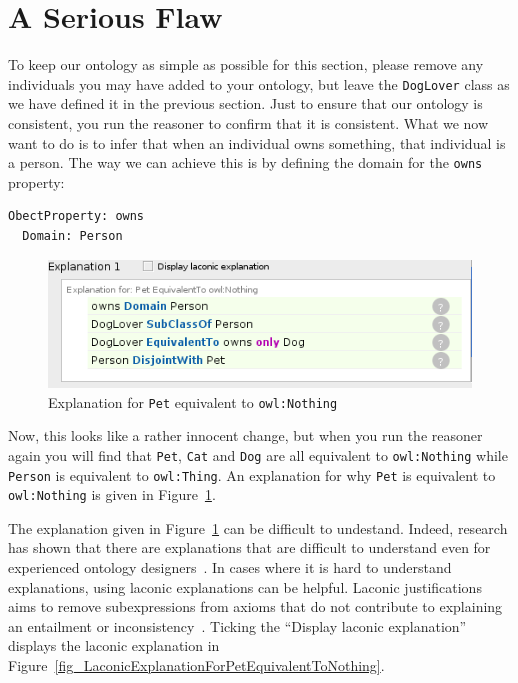 \documentclass{amsart}
\begin{document}
  \section{A Serious Flaw}
  To keep our ontology as simple as possible for this section, please remove any individuals you may have added to your ontology, but leave the \texttt{DogLover} class as we have defined it in the previous section. Just to ensure that our ontology is consistent, you run the reasoner to confirm that it is consistent. What we now want to do is to infer that when an individual owns something, that individual is a person. The way we can achieve this is by defining the domain for the \texttt{owns} property:
\begin{small}
\begin{verbatim} 
ObectProperty: owns
  Domain: Person
\end{verbatim}
\end{small}  
    \begin{figure}
      \centering \includegraphics[trim = 0mm 0mm 0mm 0mm, clip, scale=0.65]{./ExplanationForPetEquivalentToNothing.png}
      \caption{Explanation for \texttt{Pet} equivalent to \texttt{owl:Nothing}}\label{fig_ExplanationForPetEquivalentToNothing}
    \end{figure}
    
Now, this looks like a rather innocent change, but when you run the reasoner again you will find that \texttt{Pet}, \texttt{Cat} and \texttt{Dog} are all equivalent to \texttt{owl:Nothing} while \texttt{Person} is equivalent to \texttt{owl:Thing}.
An explanation for why \texttt{Pet} is equivalent to \texttt{owl:Nothing} is given in Figure~\ref{fig_ExplanationForPetEquivalentToNothing}.

The explanation given in Figure~\ref{fig_ExplanationForPetEquivalentToNothing} can be difficult to undestand. Indeed, research has shown that there are explanations that are difficult to understand even for experienced ontology designers~\cite{Horridge2011,Horridge2013}. In cases where it is hard to understand explanations, using laconic explanations can be helpful. Laconic justifications aims to remove subexpressions from axioms that do not contribute to explaining an entailment or inconsistency~\cite{Horridge2011,Horridge2013}. Ticking the ``Display laconic explanation'' displays the laconic explanation in Figure~\ref{fig_LaconicExplanationForPetEquivalentToNothing}.
\end{document}
